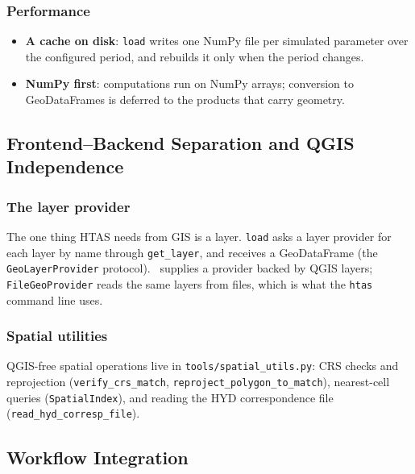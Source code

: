 \subsubsection{Performance}

\begin{itemize}
    \item \textbf{A cache on disk}: \texttt{load} writes one NumPy file per simulated parameter over the configured period, and rebuilds it only when the period changes.
    \item \textbf{NumPy first}: computations run on NumPy arrays; conversion to GeoDataFrames is deferred to the products that carry geometry.
\end{itemize}

\subsection{Frontend--Backend Separation and QGIS Independence}

\subsubsection{The layer provider}

The one thing HTAS needs from GIS is a layer. \texttt{load} asks a layer
provider for each layer by name through \texttt{get\_layer}, and receives a
GeoDataFrame (the \texttt{GeoLayerProvider} protocol). \cwv\ supplies a provider
backed by QGIS layers; \texttt{FileGeoProvider} reads the same layers from
files, which is what the \texttt{htas} command line uses.

\subsubsection{Spatial utilities}

QGIS-free spatial operations live in \texttt{tools/spatial\_utils.py}: CRS
checks and reprojection (\texttt{verify\_crs\_match},
\texttt{reproject\_polygon\_to\_match}), nearest-cell queries
(\texttt{SpatialIndex}), and reading the HYD correspondence file
(\texttt{read\_hyd\_corresp\_file}).

\subsection{Workflow Integration}

